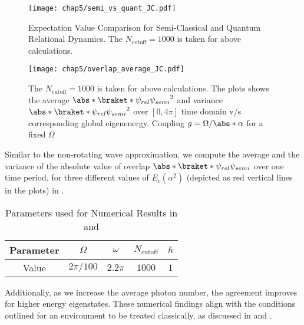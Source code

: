 \begin{figure}[!h]
        \centering
        \texttt{[image: chap5/semi\_vs\_quant\_JC.pdf]}
        \caption[Expectation Value Comparison for Semi-Classical and
         Quantum Relational Dynamics]{Expectation Value Comparison 
         for Semi-Classical and Quantum Relational Dynamics. The $N_{\mathrm{cutoff}}=1000$ is taken for above calculations.}
         \label{fig:chap5_JCM_semi_vs_quant}
\end{figure}
\begin{figure}[!h]
        \centering
        \texttt{[image: chap5/overlap\_average\_JC.pdf]}
        \caption[Average $\abs*{\braket*{\psi_{rel}}{\psi_{semi}}}^2$ 
        (\& variance $\abs*{\braket*{\psi_{rel}}{\psi_{semi}}}^2$)
         v/s Global Eigen Energy]{The $N_{\mathrm{cutoff}}=1000$ is taken for above calculations.
         The plots shows the average $\abs*{\braket*{\psi_{rel}}{\psi_{semi}}}^2$ and 
         variance $\abs*{\braket*{\psi_{rel}}{\psi_{semi}}}^2$ over \([0, 4\pi]\) time domain 
         v/s corresponding global eigenenergy.
         Coupling \(g = \Omega / \abs*{\alpha}\) for a fixed \(\Omega\)}
         \label{fig:chap5_JCM_overlap_avg}
\end{figure}

Similar to the non-rotating wave approximation, we compute the average and the 
variance of the absolute value of overlap \(\abs*{\braket*{\psi_{rel}}{\psi_{semi}}}\) over one time period, 
for three different values of \(E_c(\alpha^2)\) (depicted as red vertical lines in the plots)
in .

\begin{table}[ht]
    \centering
    \label{tab:numerical_values}
        \begin{tabular}{|c|c|c|c|c|}
            \hline
            Parameter & $\Omega$ & $\omega$ & $N_{\text{cutoff}}$ & $\hbar$ \\
            \hline
            Value & $2\pi/100$ & $2.2\pi$ & $1000$ & $1$ \\
            \hline
        \end{tabular}
    \caption{Parameters used for Numerical Results in  and 
    }
\end{table}
Additionally, as we increase the average photon number, the agreement improves for 
higher energy eigenstates. These numerical findings align with the conditions outlined for an 
environment to be treated classically, as discussed in  and 
.


